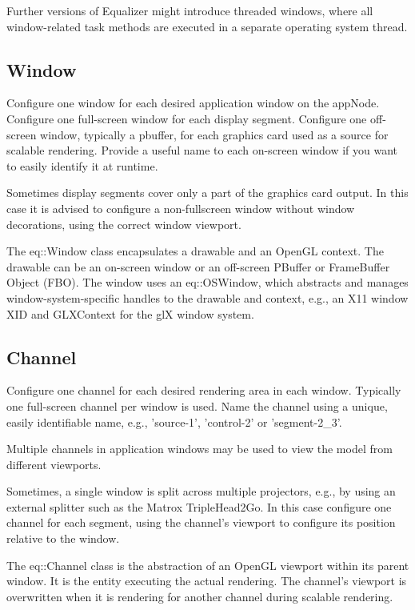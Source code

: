 \documentclass[10pt,a4]{scrartcl}
\begin{document}
Further versions of Equalizer might introduce threaded windows, where
all window-related task methods are executed in a separate operating
system thread.

\subsection{Window}

Configure one \textsf{window} for each desired application window on the
appNode. Configure one full-screen window for each display
segment. Configure one off-screen window, typically a pbuffer, for each
graphics card used as a source for scalable rendering. Provide a useful
name to each on-screen window if you want to easily identify it at runtime.

Sometimes display segments cover only a part of the graphics card
output. In this case it is advised to configure a non-fullscreen window
without window decorations, using the correct window viewport.

The \textsf{eq::Window} class encapsulates a drawable and an OpenGL
context. The drawable can be an on-screen window or an off-screen
PBuffer or FrameBuffer Object (FBO). The window uses an
\textsf{eq::OSWindow}, which abstracts and manages
window-system-specific handles to the drawable and context, e.g., an X11
window \textsf{XID} and \textsf{GLXContext} for the glX window system.

\subsection{Channel}

Configure one \textsf{channel} for each desired rendering area in each
window. Typically one full-screen channel per window is used. Name the
channel using a unique, easily identifiable name, e.g., 'source-1',
'control-2' or 'segment-2\_3'.

Multiple channels in application windows may be used to view the model
from different viewports.

Sometimes, a single window is split across multiple projectors, e.g., by
using an external splitter such as the Matrox TripleHead2Go. In this
case configure one channel for each segment, using the channel's
\textsf{viewport} to configure its position relative to the window.

The \textsf{eq::Channel} class is the abstraction of an OpenGL viewport
within its parent window. It is the entity executing the actual
rendering. The channel's viewport is overwritten when it is rendering
for another channel during scalable rendering.
\end{document}
